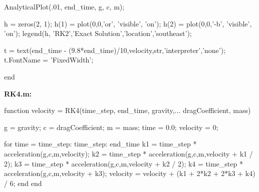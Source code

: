 \documentclass[12pt]{article}
\begin{document}
\begin{verbatimtab}
    AnalyticalPlot(.01, end_time, g, c, m);
    
    h = zeros(2, 1);                          %
    h(1) = plot(0,0,'or', 'visible', 'on');   %
    h(2) = plot(0,0,'-b', 'visible', 'on');   %
    legend(h, 'RK2','Exact Solution','location','southeast');
    
    t = text(end_time - (9.8*end_time)/10,velocity,str,'interpreter','none');
    t.FontName = 'FixedWidth'; %

end
\end{verbatimtab}
\textbf{RK4.m:}
\begin{verbatimtab}
function velocity = RK4(time_step, end_time, gravity,... 
                        dragCoefficient, mass)
                    

    g = gravity;            %
    c = dragCoefficient;    %
    m = mass;               %
    time = 0.0;             %
    velocity = 0;           %
    
    for time = time_step: time_step: end_time
        k1 = time_step * acceleration(g,c,m,velocity);
        k2 = time_step * acceleration(g,c,m,velocity + k1 / 2);
        k3 = time_step * acceleration(g,c,m,velocity + k2 / 2);
        k4 = time_step * acceleration(g,c,m,velocity + k3);
        velocity = velocity + (k1 + 2*k2 + 2*k3 + k4) / 6;
    end
end
\end{verbatimtab}
\end{document}
